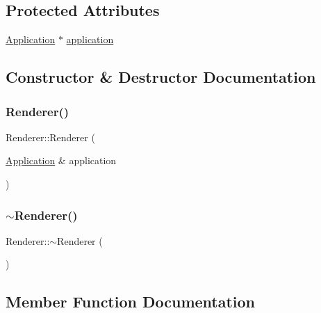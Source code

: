 \subsection*{Protected Attributes}
\begin{DoxyCompactItemize}
\item 
\mbox{\hyperlink{classsage_1_1Application}{Application}} $\ast$ \mbox{\hyperlink{classsage_1_1Renderer_a76559bf364299fb39ce7d9d084d56958}{application}}
\end{DoxyCompactItemize}


\subsection{Constructor \& Destructor Documentation}
\mbox{\label{classsage_1_1Renderer_aea1ceb080017504798f28cde4d45502e}} 
\subsubsection{\texorpdfstring{Renderer()}{Renderer()}}
{\footnotesize\ttfamily Renderer\+::\+Renderer (\begin{DoxyParamCaption}\item[{\mbox{\hyperlink{classsage_1_1Application}{Application}} \&}]{application }\end{DoxyParamCaption})}

\mbox{\label{classsage_1_1Renderer_afeee408862d5bd6255a6882d47e6d5cd}} 
\subsubsection{\texorpdfstring{$\sim$Renderer()}{~Renderer()}}
{\footnotesize\ttfamily Renderer\+::$\sim$\+Renderer (\begin{DoxyParamCaption}{ }\end{DoxyParamCaption})\hspace{0.3cm}{\ttfamily [virtual]}}



\subsection{Member Function Documentation}
\mbox{\label{classsage_1_1Renderer_af7e5f8f68742f198e315fb4683a605a4}} 
